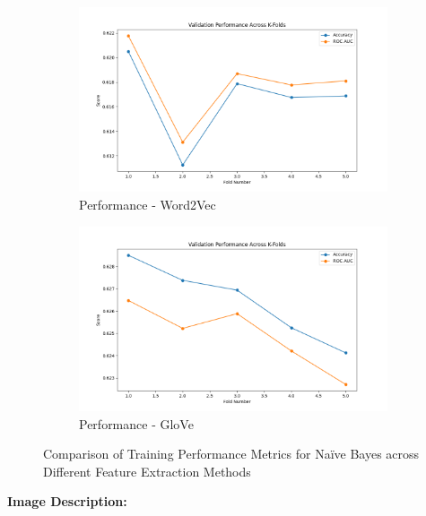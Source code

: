 \begin{figure}[H]
    \begin{subfigure}[b]{0.48\textwidth}
        \includegraphics[width=\textwidth]{img/report_info/img/3.1.NaiveBayes/best_bayesian_word2vec.png}
        \caption{Performance - Word2Vec}
        \label{fig:nb-word2vec}
    \end{subfigure}
    \begin{subfigure}[b]{0.48\textwidth}
        \includegraphics[width=\textwidth]{img/report_info/img/3.1.NaiveBayes/best_bayesian_glove.png}
        \caption{Performance - GloVe}
        \label{fig:nb-glove}
    \end{subfigure}
    
    \caption{Comparison of Training Performance Metrics for Naïve Bayes across Different Feature Extraction Methods}
    \label{fig:nb-performance-group}
\end{figure}

\textbf{Image Description:}

